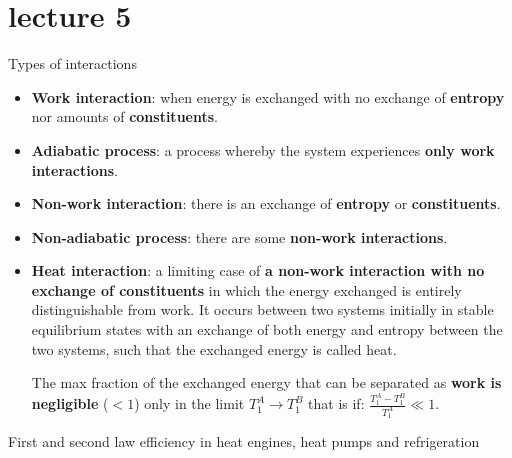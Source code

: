 \section{lecture 5}
\begin{defn}
    Types of interactions

    \begin{itemize}
        \item \textbf{Work interaction}: when energy is exchanged with no exchange of 
        \textbf{entropy} nor amounts of \textbf{constituents}. 
        \item \textbf{Adiabatic process}: a process whereby the system experiences \textbf{only work interactions}.
        \item \textbf{Non-work interaction}: there is an exchange of \textbf{entropy} or \textbf{constituents}. 
        \item \textbf{Non-adiabatic process}: there are some \textbf{non-work interactions}.
        \item \textbf{Heat interaction}: a limiting case of \textbf{a non-work interaction with no exchange of constituents} 
        in which the energy exchanged is entirely distinguishable from work. It occurs between two systems initially in 
        stable equilibrium states with an exchange of both energy and entropy between the two systems, 
        such that the exchanged energy is called heat.

        The max fraction of the exchanged energy that can be separated as \textbf{work is negligible} (\(< 1\)) only 
        in the limit \( T_1^A \rightarrow T_1^B \) that is if:
    \(
    \frac{T_1^A - T_1^B}{T_1^A} \ll 1
    \).
    \end{itemize}
\end{defn}
\begin{example}
    First and second law 
    efficiency
     in
     heat engines,
     heat pumps and
    refrigeration
\end{example}
